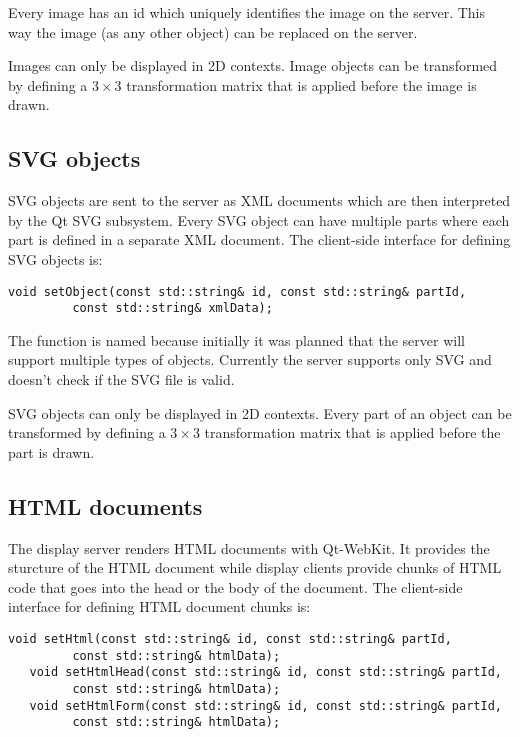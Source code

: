 Every image has an id which uniquely identifies the image on the server. This
way the image (as any other object) can be replaced on the server.

Images can only be displayed in 2D contexts. Image objects can be transformed
by defining a $3 \times 3$ transformation matrix that is applied before
the image is drawn.

\subsection{SVG objects}

SVG objects are sent to the server as XML documents which are then interpreted
by the Qt SVG subsystem. Every SVG object can have multiple parts where each
part is defined in a separate XML document.
The client-side interface for defining SVG objects is:

\begin{Verbatim}[fontsize=\scriptsize,gobble=3]
   void setObject(const std::string& id, const std::string& partId,
         const std::string& xmlData); 
\end{Verbatim}

The function is named  because initially it was planned that
the server will support multiple types of objects. Currently the server
supports only SVG and doesn't check if the SVG file is valid.

SVG objects can only be displayed in 2D contexts. Every part of an object can
be transformed by defining a $3 \times 3$ transformation matrix that is applied
before the part is drawn.

\subsection{HTML documents}

The display server renders HTML documents with Qt-WebKit. It provides the
sturcture of the HTML document while display clients provide chunks of
HTML code that goes into the head or the body of the document.
The client-side interface for defining HTML document chunks is:

\begin{Verbatim}[fontsize=\scriptsize,gobble=3]
   void setHtml(const std::string& id, const std::string& partId,
         const std::string& htmlData); 
   void setHtmlHead(const std::string& id, const std::string& partId,
         const std::string& htmlData); 
   void setHtmlForm(const std::string& id, const std::string& partId,
         const std::string& htmlData); 
\end{Verbatim}

